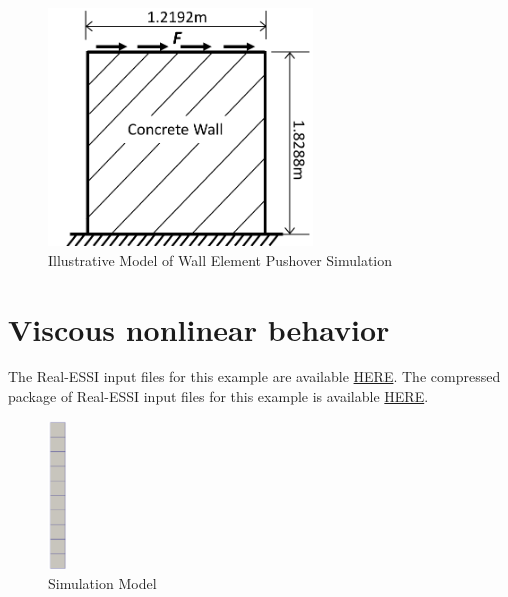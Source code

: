 \begin{figure}[H]
  \centering
  \includegraphics[width = 7cm]{./Figure-files/Day3/Wall_Pushover/overview.pdf}
  \caption{Illustrative Model of Wall Element Pushover Simulation }
  \label{fig_frame_pushover_wall}
\end{figure}


\clearpage
\newpage
\section{ Viscous nonlinear behavior }
\label{Viscous_nonlinear_behavior}

The Real-ESSI input files for this example are available 
\href{https://github.com/yuan-energy/Real-ESSI-Short-Course-Examples/tree/master/short-course-examples/Day3/Viscous_nonlinear_behavior/Rayleigh}{HERE}. 
The compressed package of Real-ESSI input files for this example is available 
\href{https://github.com/yuan-energy/Real-ESSI-Short-Course-Examples/blob/master/short-course-examples/Day3/Viscous_nonlinear_behavior/Rayleigh/Rayleigh.tgz?raw=true}{HERE}. 


\begin{figure}[H]
  \centering
  \includegraphics[width = 0.5cm]{./Figure-files/Day3/Viscous_nonlinear_behavior/overview.png}
  \caption{Simulation Model}
  \label{fig_contact_examples1}
\end{figure}

